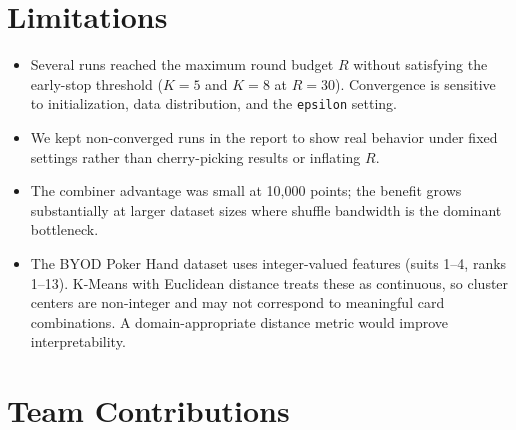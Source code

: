 \documentclass[11pt]{article}
\begin{document}
\section{Limitations}

\begin{itemize}[noitemsep,topsep=2pt]
  \item Several runs reached the maximum round budget $R$ without satisfying the early-stop threshold ($K=5$ and $K=8$ at $R=30$). Convergence is sensitive to initialization, data distribution, and the \texttt{epsilon} setting.
  \item We kept non-converged runs in the report to show real behavior under fixed settings rather than cherry-picking results or inflating $R$.
  \item The combiner advantage was small at 10,000 points; the benefit grows substantially at larger dataset sizes where shuffle bandwidth is the dominant bottleneck.
  \item The BYOD Poker Hand dataset uses integer-valued features (suits 1--4, ranks 1--13). K-Means with Euclidean distance treats these as continuous, so cluster centers are non-integer and may not correspond to meaningful card combinations. A domain-appropriate distance metric would improve interpretability.
\end{itemize}

\section{Team Contributions}
\end{document}
